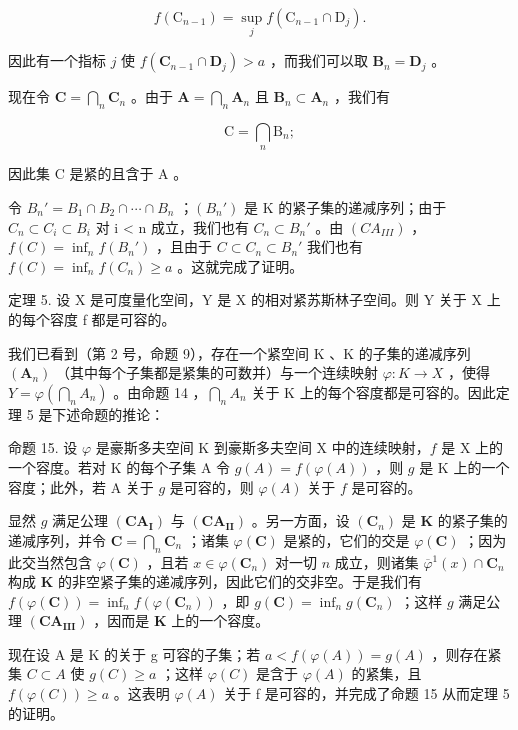\[
f \left(\mathrm{C} _ {n - 1}\right) = \sup _ {j} f \left(\mathrm{C} _ {n - 1} \cap \mathrm{D} _ {j}\right).
\]

因此有一个指标 \(j\) 使 \(f(\mathbf{C}_{n-1} \cap \mathbf{D}_j) > a\) ，而我们可以取 \(\mathbf{B}_n = \mathbf{D}_j\) 。

现在令 \(\mathbf{C} = \bigcap_{n}\mathbf{C}_{n}\) 。由于 \(\mathbf{A} = \bigcap_{n}\mathbf{A}_{n}\) 且 \(\mathbf{B}_n\subset \mathbf{A}_n\) ，我们有

\[
\mathrm{C} = \bigcap_ {n} \mathrm{B} _ {n};
\]

因此集 C 是紧的且含于 A 。

令 \(B_n' = B_1 \cap B_2 \cap \cdots \cap B_n\) ；\((B_n')\) 是 K 的紧子集的递减序列；由于 \(C_n \subset C_i \subset B_i\) 对 i \textless{} n 成立，我们也有 \(C_n \subset B_n'\) 。由 \((CA_{III})\) ，\(f(C) = \inf_{n} f(B_n')\) ，且由于 \(C \subset C_n \subset B_n'\) 我们也有 \(f(C) = \inf_{n} f(C_n) \geqslant a\) 。这就完成了证明。

定理 5. 设 X 是可度量化空间，Y 是 X 的相对紧苏斯林子空间。则 Y 关于 X 上的每个容度 f 都是可容的。

我们已看到（第 2 号，命题 9），存在一个紧空间 K 、K 的子集的递减序列 \((\mathbf{A}_{n})\) （其中每个子集都是紧集的可数并）与一个连续映射 \(\varphi: K \to X\) ，使得 \(Y = \varphi\left(\bigcap_{n} A_{n}\right)\) 。由命题 14 ，\(\bigcap_{n} A_{n}\) 关于 K 上的每个容度都是可容的。因此定理 5 是下述命题的推论：

命题 15. 设 \(\varphi\) 是豪斯多夫空间 K 到豪斯多夫空间 X 中的连续映射，\(f\) 是 X 上的一个容度。若对 K 的每个子集 A 令 \(g(A) = f(\varphi(A))\) ，则 \(g\) 是 K 上的一个容度；此外，若 A 关于 \(g\) 是可容的，则 \(\varphi(A)\) 关于 \(f\) 是可容的。

显然 \(g\) 满足公理 \((\mathbf{CA}_{\mathbf{I}})\) 与 \((\mathbf{CA}_{\mathbf{II}})\) 。另一方面，设 \((\mathbf{C}_n)\) 是 \(\mathbf{K}\) 的紧子集的递减序列，并令 \(\mathbf{C} = \bigcap_{n} \mathbf{C}_n\) ；诸集 \(\varphi(\mathbf{C})\) 是紧的，它们的交是 \(\varphi(\mathbf{C})\) ；因为此交当然包含 \(\varphi(\mathbf{C})\) ，且若 \(x \in \varphi(\mathbf{C}_n)\) 对一切 \(n\) 成立，则诸集 \(\overline{\varphi}^1(x) \cap \mathbf{C}_n\) 构成 \(\mathbf{K}\) 的非空紧子集的递减序列，因此它们的交非空。于是我们有 \(f(\varphi(\mathbf{C})) = \inf_{n} f(\varphi(\mathbf{C}_n))\) ，即 \(g(\mathbf{C}) = \inf_{n} g(\mathbf{C}_n)\) ；这样 \(g\) 满足公理 \((\mathbf{CA}_{\mathbf{III}})\) ，因而是 \(\mathbf{K}\) 上的一个容度。

现在设 A 是 K 的关于 g 可容的子集；若 \(a < f(\varphi(A)) = g(A)\) ，则存在紧集 \(C \subset A\) 使 \(g(C) \geqslant a\) ；这样 \(\varphi(C)\) 是含于 \(\varphi(A)\) 的紧集，且 \(f(\varphi(C)) \geqslant a\) 。这表明 \(\varphi(A)\) 关于 f 是可容的，并完成了命题 15 从而定理 5 的证明。

